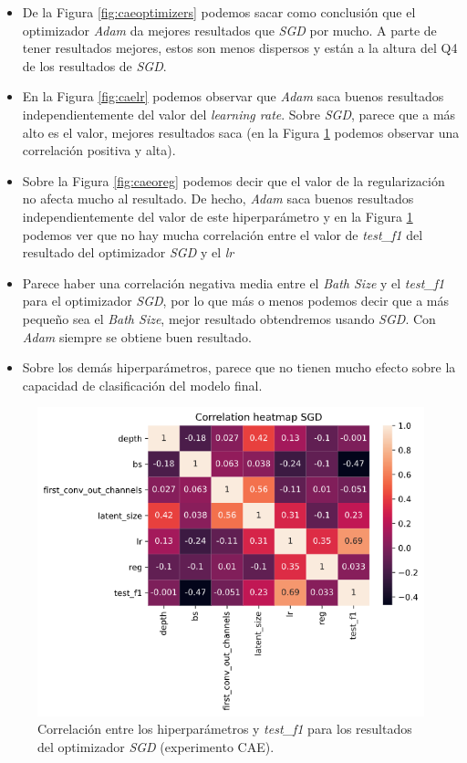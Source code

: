 \begin{itemize}
    \item De la Figura \ref{fig:caeoptimizers} podemos sacar como conclusión que el optimizador \textit{Adam} da mejores resultados que \textit{SGD} por mucho. A parte de tener resultados mejores, estos son menos dispersos y están a la altura del Q4 de los resultados de \textit{SGD}.
    \item En la Figura \ref{fig:caelr} podemos observar que \textit{Adam} saca buenos resultados independientemente del valor del \textit{learning rate}. Sobre \textit{SGD}, parece que a más alto es el valor, mejores resultados saca (en la Figura \ref{fig:caesgdcorr} podemos observar una correlación positiva y alta).
    \item Sobre la Figura \ref{fig:caeoreg} podemos decir que el valor de la regularización no afecta mucho al resultado. De hecho, \textit{Adam} saca buenos resultados independientemente del valor de este hiperparámetro y en la Figura \ref{fig:caesgdcorr} podemos ver que no hay mucha correlación entre el valor de \textit{test\_f1} del resultado del optimizador \textit{SGD} y el \textit{lr}
    \item Parece haber una correlación negativa media entre el \textit{Bath Size} y el \textit{test\_f1} para el optimizador \textit{SGD}, por lo que más o menos podemos decir que a más pequeño sea el \textit{Bath Size}, mejor resultado obtendremos usando \textit{SGD}. Con \textit{Adam} siempre se obtiene buen resultado.
    \item Sobre los demás hiperparámetros, parece que no tienen mucho efecto sobre la capacidad de clasificación del modelo final.
\end{itemize}

\begin{figure}[H]
  \centering
  \includegraphics[width=.8\linewidth]{imagenes/06_Experimentacion/caeimages/caesgdcorr.png}  
  \caption{Correlación entre los hiperparámetros y \textit{test\_f1} para los resultados del optimizador \textit{SGD} (experimento CAE).}
  \label{fig:caesgdcorr}
\end{figure}

